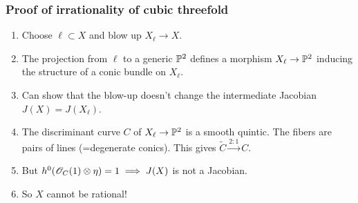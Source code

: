 \begin{frame}
\frametitle{Proof of irrationality of cubic threefold}

\begin{enumerate}
	\item Choose $\ell \subset X$ and blow up $X_\ell \to X$.
	\pause
	\item The projection from $\ell$ to a generic $\P^2$ defines a morphism $X_\ell \to \P^2$ inducing the structure of a conic bundle on $X_\ell$.
	\pause
	\item Can show that the blow-up doesn't change the intermediate Jacobian $J(X)=J(X_\ell)$.
	\pause
	\item The discriminant curve $C$ of $X_\ell \to \P^2$ is a smooth quintic. The fibers are pairs of lines (=degenerate conics). This gives $\widetilde C \xrightarrow{2:1} C$.
	\pause
	\item But $h^0(\OO_C(1) \otimes \eta)=1 \implies J(X)$ is not a Jacobian.
	\pause
	\item So $X$ cannot be rational!
\end{enumerate}

\end{frame}
